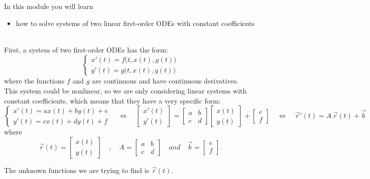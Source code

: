 In this module you will learn
\begin{itemize}
	\item how to solve systems of two linear first-order ODEs with constant coefficients
\end{itemize}

\hfill \\


First, a system of two first-order ODEs has the form:
$$
\begin{cases}
x'(t) = f\big(t, x(t),y(t)\big) \\	
y'(t) = g\big(t, x(t),y(t)\big)
\end{cases}
$$
where the functions $f$ and $g$ are continuous and have continuous derivatives. \\

This system could be nonlinear, so we are only considering linear systems with constant coefficients, which means that they have a very specific form:
$$
\begin{cases}
	x'(t) = a x(t) + b y(t) + e\\
	y'(t) = c x(t) + d y(t) + f
\end{cases}
%
\quad \Leftrightarrow \quad 
	\begin{bmatrix} x'(t) \\ y'(t) \end{bmatrix}
	=
	\begin{bmatrix} a & b \\ c & d \end{bmatrix}
	\begin{bmatrix} x(t) \\ y(t) \end{bmatrix}
	+	\begin{bmatrix} e \\ f \end{bmatrix}
%
\quad \Leftrightarrow \quad 
	\vec{r}'(t)
	=
	A \, \vec{r}(t) + \vec{b}
$$
where
$$
\vec{r}(t) = \begin{bmatrix} x(t) \\ y(t) \end{bmatrix}
\quad , \quad 
A = \begin{bmatrix} a & b \\ c & d \end{bmatrix}
\quad and \quad 
\vec{b}=\begin{bmatrix} e \\ f \end{bmatrix}.
$$

The unknown functions we are trying to find is $\vec{r}(t)$. \\


